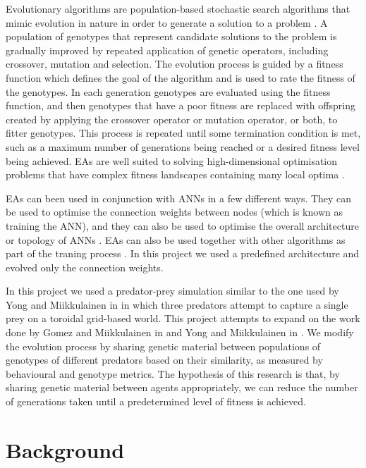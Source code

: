 \documentclass[12pt]{article} %
\begin{document}
Evolutionary algorithms are population-based stochastic search algorithms that mimic evolution in nature in order to generate a solution to a problem \cite{Floreano2008}\cite{Yao1999}. A population of genotypes that represent candidate solutions to the problem is gradually improved by repeated application of genetic operators, including crossover, mutation and selection. The evolution process is guided by a fitness function which defines the goal of the algorithm and is used to rate the fitness of the genotypes. In each generation genotypes are evaluated using the fitness function, and then genotypes that have a poor fitness are replaced with offspring created by applying the crossover operator or mutation operator, or both, to fitter genotypes. This process is repeated until some termination condition is met, such as a maximum number of generations being reached or a desired fitness level being achieved. EAs are well suited to solving high-dimensional optimisation problems that have complex fitness landscapes containing many local optima \cite{Yao1999}.

EAs can been used in conjunction with ANNs in a few different ways. They can be used to optimise the connection weights between nodes (which is known as training the ANN), and they can also be used to optimise the overall architecture or topology of ANNs \cite{Yao1999}. EAs can also be used together with other algorithms as part of the traning process \cite{Yao1999}. In this project we used a predefined architecture and evolved only the connection weights.

In this project we used a predator-prey simulation similar to the one used by Yong and Miikkulainen in \cite{Yong2001} in which three predators attempt to capture a single prey on a toroidal grid-based world. This project attempts to expand on the work done by Gomez and Miikkulainen in \cite{Gomez1997} and Yong and Miikkulainen in \cite{Yong2001}. We modify the evolution process by sharing genetic material between populations of genotypes of different predators based on their similarity, as measured by behavioural and genotype metrics. The hypothesis of this research is that, by sharing genetic material between agents appropriately, we can reduce the number of generations taken until a predetermined level of fitness is achieved.

\section{Background}
\end{document}
